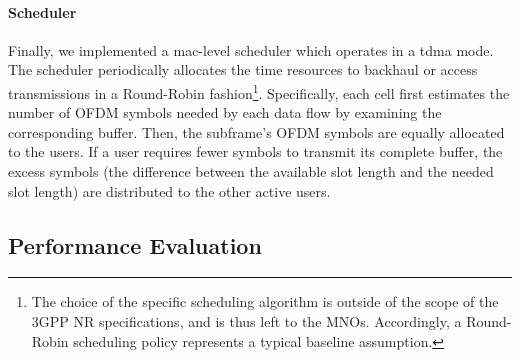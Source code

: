 \paragraph{Scheduler}
\label{sub:scheduler}
Finally, we implemented a \gls{mac}-level scheduler which operates in a \gls{tdma} mode. The scheduler periodically allocates the time resources to backhaul or access transmissions in a Round-Robin fashion\footnote{The choice of the specific scheduling algorithm is outside of the scope of the 3GPP NR specifications, and is thus left to the MNOs. Accordingly, a Round-Robin scheduling policy represents a typical baseline assumption.}. Specifically, each cell first estimates the number of OFDM symbols needed by each data flow by examining the corresponding buffer. Then, the subframe's OFDM symbols are equally allocated to the users. If a user requires fewer symbols to transmit its complete buffer, the excess symbols (the difference between the available slot length and the needed slot length) are distributed to the other active users. 

\subsection {Performance Evaluation}
\label{s:simulation_analysis}

